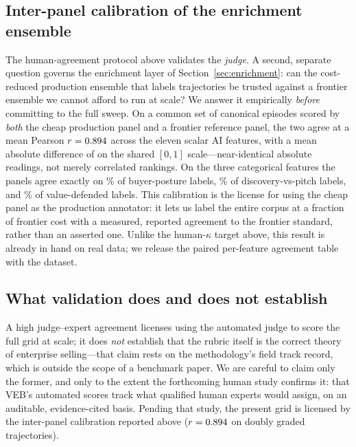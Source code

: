 \subsection{Inter-panel calibration of the enrichment ensemble}
\label{sec:panel-calibration}
The human-agreement protocol above validates the \emph{judge}. A second, separate
question governs the enrichment layer of Section~\ref{sec:enrichment}: can the
cost-reduced production ensemble that labels \resEnrichRows{} trajectories be
trusted against a frontier ensemble we cannot afford to run at scale? We answer it
empirically \emph{before} committing to the full sweep. On a common set of
\resPanelCalibN{} canonical episodes scored by \emph{both} the cheap production
panel and a frontier reference panel, the two agree at a mean Pearson
$r=0.894{}$ across the eleven scalar AI features, with a mean absolute
difference of \resPanelMAD{} on the shared $[0,1]$ scale---near-identical absolute
readings, not merely correlated rankings. On the three categorical features the
panels agree exactly on \resPanelCatPosture{}\% of buyer-posture labels,
\resPanelCatDiscovery{}\% of discovery-vs-pitch labels, and \resPanelCatEthic{}\%
of value-defended labels. This calibration is the license for using the cheap
panel as the production annotator: it lets us label the entire corpus at a fraction
of frontier cost with a measured, reported agreement to the frontier standard,
rather than an asserted one. Unlike the human-$\kappa$ target above, this result is
already in hand on real data; we release the paired per-feature agreement table
with the dataset.

\subsection{What validation does and does not establish}
A high judge--expert agreement licenses using the automated judge to score the
full grid at scale; it does \emph{not} establish that the rubric itself is the
correct theory of enterprise selling---that claim rests on the methodology's field
track record, which is outside the scope of a benchmark paper. We are careful to
claim only the former, and only to the extent the forthcoming human study confirms it:
that VEB's automated scores track what qualified human experts would assign, on an
auditable, evidence-cited basis. Pending that study, the present grid is licensed by
the inter-panel calibration reported above ($r=0.894{}$ on
\resPanelCalibN{} doubly graded trajectories).
